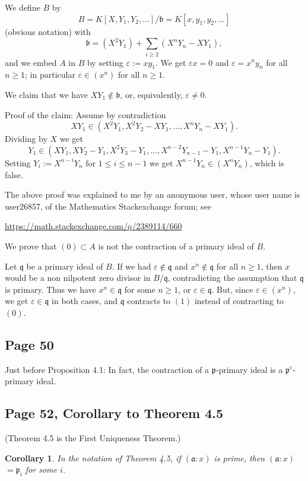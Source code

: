 \documentclass[parskip=half,fontsize=12pt]{scrartcl}%
\newcommand{\oo}{\operatorname}\newcommand{\ooo}{\operatorname*}
\newcommand{\mf}{\mathfrak}
\newcommand{\aaa}{\mf a}
\newcommand{\ppp}{\mf p}
\newtheorem{cor}[thm]{Corollary}
\begin{document}
We define $B$ by 
$$
B=K[X,Y_1,Y_2,\dots]/\mathfrak b=K[x,y_1,y_2,\dots]
$$ 
(obvious notation) with 
$$
\mathfrak b=(X^2Y_1)+\sum_{i\ge2}(X^nY_n-XY_1),
$$
and we embed $A$ in $B$ by setting $\varepsilon:=xy_1$. We get $\varepsilon x=0$ and $\varepsilon=x^ny_n$ for all $n\ge1$; in particular $\varepsilon\in(x^n)$ for all $n\ge1$.

We claim that we have $XY_1\notin\mathfrak b$, or, equivalently, $\varepsilon\ne0$.

Proof of the claim: Assume by contradiction 
$$
XY_1\in(X^2Y_1,X^2Y_2-XY_1,\dots,X^nY_n-XY_1).
$$ 
Dividing by $X$ we get 
$$
Y_1\in(XY_1,XY_2-Y_1,X^2Y_3-Y_1,\dots,X^{n-2}Y_{n-1}-Y_1,X^{n-1}Y_n-Y_1).
$$ 
Setting $Y_i:=X^{n-i}Y_n$ for $1\le i\le n-1$ we get $X^{n-1}Y_n\in(X^nY_n)$, which is false. 

The above proof was explained to me by an anonymous user, whose user name is user26857, of the Mathematics Stackexchange forum; see 

\href{https://math.stackexchange.com/q/2389114/660}{https://math.stackexchange.com/q/2389114/660}

We prove that $(0)\subset A$ is not the contraction of a primary ideal of $B$.

Let $\mathfrak q$ be a primary ideal of $B$. If we had $\varepsilon\notin\mathfrak q$ and $x^n\notin\mathfrak q$ for all $n\ge1$, then $x$ would be a non nilpotent zero divisor in $B/\mathfrak q$, contradicting the assumption that $\mathfrak q$ is primary. Thus we have $x^n\in\mathfrak q$ for some $n\ge1$, or $\varepsilon\in\mathfrak q$. But, since $\varepsilon\in(x^n)$, we get $\varepsilon\in\mathfrak q$ in both cases, and $\mathfrak q$ contracts to $(1)$ instead of contracting to $(0)$.

\subsection{Page 50}\label{contrpry}%

Just before Proposition 4.1: In fact, the contraction of a $\ppp$-primary ideal is a $\ppp^{\oo c}$-primary ideal.

\subsection{Page 52, Corollary to Theorem 4.5}%

(Theorem 4.5 is the First Uniqueness Theorem.)
\begin{cor}\label{c45}
In the notation of Theorem 4.5, if %
$(\aaa:x)$ is prime, then $(\aaa:x)$ $=\ppp_i$ for some $i$. %
\end{cor}
\end{document}
